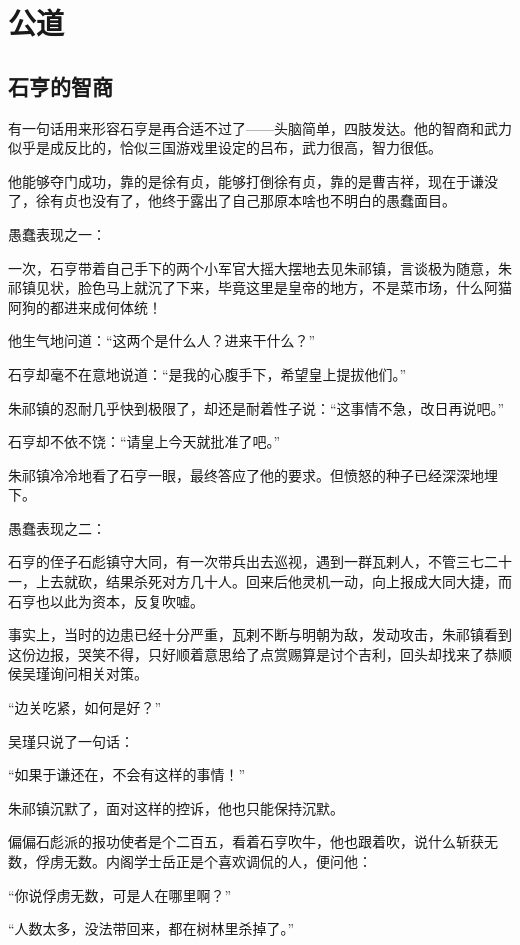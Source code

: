 \section{公道}
\ifnum{}
	\begin{multicols}{\theparacolNo}
\fi
\subsection{石亨的智商}
有一句话用来形容石亨是再合适不过了——头脑简单，四肢发达。他的智商和武力似乎是成反比的，恰似三国游戏里设定的吕布，武力很高，智力很低。

他能够夺门成功，靠的是徐有贞，能够打倒徐有贞，靠的是曹吉祥，现在于谦没了，徐有贞也没有了，他终于露出了自己那原本啥也不明白的愚蠢面目。

愚蠢表现之一：

一次，石亨带着自己手下的两个小军官大摇大摆地去见朱祁镇，言谈极为随意，朱祁镇见状，脸色马上就沉了下来，毕竟这里是皇帝的地方，不是菜市场，什么阿猫阿狗的都进来成何体统！

他生气地问道：“这两个是什么人？进来干什么？”

石亨却毫不在意地说道：“是我的心腹手下，希望皇上提拔他们。”

朱祁镇的忍耐几乎快到极限了，却还是耐着性子说：“这事情不急，改日再说吧。”

石亨却不依不饶：“请皇上今天就批准了吧。”

朱祁镇冷冷地看了石亨一眼，最终答应了他的要求。但愤怒的种子已经深深地埋下。

愚蠢表现之二：

石亨的侄子石彪镇守大同，有一次带兵出去巡视，遇到一群瓦剌人，不管三七二十一，上去就砍，结果杀死对方几十人。回来后他灵机一动，向上报成大同大捷，而石亨也以此为资本，反复吹嘘。

事实上，当时的边患已经十分严重，瓦剌不断与明朝为敌，发动攻击，朱祁镇看到这份边报，哭笑不得，只好顺着意思给了点赏赐算是讨个吉利，回头却找来了恭顺侯吴瑾询问相关对策。

“边关吃紧，如何是好？”

吴瑾只说了一句话：

“如果于谦还在，不会有这样的事情！”

朱祁镇沉默了，面对这样的控诉，他也只能保持沉默。

偏偏石彪派的报功使者是个二百五，看着石亨吹牛，他也跟着吹，说什么斩获无数，俘虏无数。内阁学士岳正是个喜欢调侃的人，便问他：

“你说俘虏无数，可是人在哪里啊？”

“人数太多，没法带回来，都在树林里杀掉了。”


\end{multicols}
